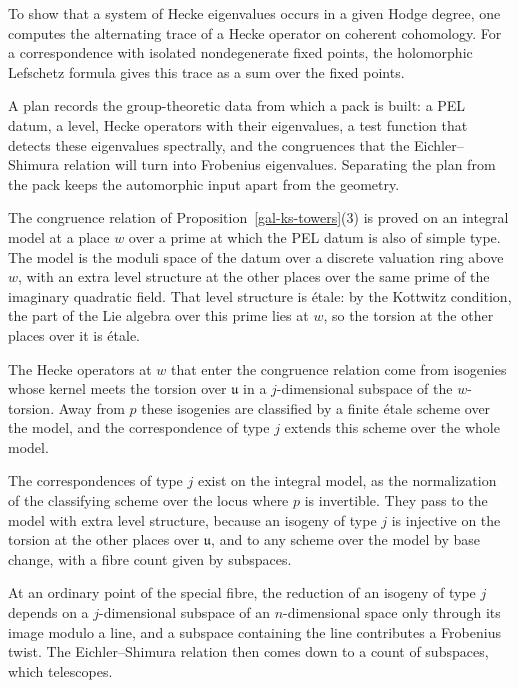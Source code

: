 To show that a system of Hecke eigenvalues occurs in a given Hodge degree, one computes the alternating
trace of a Hecke operator on coherent cohomology. For a correspondence with isolated nondegenerate fixed
points, the holomorphic Lefschetz formula gives this trace as a sum over the fixed points.

A plan records the group-theoretic data from which a pack is built: a PEL datum, a level, Hecke
operators with their eigenvalues, a test function that detects these eigenvalues spectrally, and the
congruences that the Eichler--Shimura relation will turn into Frobenius eigenvalues. Separating the plan
from the pack keeps the automorphic input apart from the geometry.

The congruence relation of Proposition~\ref{gal-ks-towers}(3) is proved on an integral model at a
place $w$ over a prime at which the PEL datum is also of simple type. The model is the moduli space of
the datum over a discrete valuation ring above $w$, with an extra level structure at the other places
over the same prime of the imaginary quadratic field. That level structure is \'etale: by the Kottwitz
condition, the part of the Lie algebra over this prime lies at $w$, so the torsion at the other places
over it is \'etale.

The Hecke operators at $w$ that enter the congruence relation come from isogenies whose kernel meets the
torsion over $\mathfrak u$ in a $j$-dimensional subspace of the $w$-torsion. Away from $p$ these
isogenies are classified by a finite \'etale scheme over the model, and the correspondence of type $j$
extends this scheme over the whole model.

The correspondences of type $j$ exist on the integral model, as the normalization of the classifying
scheme over the locus where $p$ is invertible. They pass to the model with extra level structure,
because an isogeny of type $j$ is injective on the torsion at the other places over $\mathfrak u$, and
to any scheme over the model by base change, with a fibre count given by subspaces.

At an ordinary point of the special fibre, the reduction of an isogeny of type $j$ depends on a
$j$-dimensional subspace of an $n$-dimensional space only through its image modulo a line, and a
subspace containing the line contributes a Frobenius twist. The Eichler--Shimura relation then comes
down to a count of subspaces, which telescopes.


